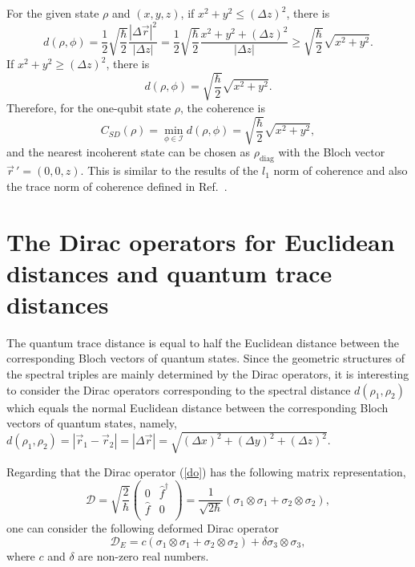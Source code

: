 \documentclass[a4paper,12pt]{article}
\begin{document}
For the given state $\rho$ and $(x, y, z)$, if
$x^2+y^2\leqslant (\Delta z)^2$, there is
\begin{equation}
	d(\rho,\phi)
	=\frac{1}{2}\sqrt{\frac{\hbar}{2}}\frac{|\Delta \vec{r}|^2}{|\Delta z|}
	=\frac{1}{2}\sqrt{\frac{\hbar}{2}}\frac{x^2+y^2+(\Delta z)^2}{|\Delta z|}
	\geqslant\sqrt{\frac{\hbar}{2}}\sqrt{x^2+y^2}.
\end{equation}
If $x^2+y^2\geqslant (\Delta z)^2$,
there is
\begin{equation}
	d(\rho,\phi)
	=\sqrt{\frac{\hbar}{2}}\sqrt{x^2+y^2}.
\end{equation}
Therefore, for the one-qubit state $\rho$, the coherence is
\begin{equation}
	C_{SD}(\rho)=\min_{\phi\in\mathcal{I}}d(\rho,\phi)=\sqrt{\frac{\hbar}{2}}\sqrt{x^2+y^2},
\end{equation}
and the nearest incoherent state can be chosen as $\rho_{\textrm{diag}}$ with the Bloch vector $\vec{r}\,'=(0, 0, z)$.
This is similar to the results of the $l_1$ norm of coherence \cite{Baumgratz} and also the trace norm of coherence defined in Ref.~\cite{Shao}.




\section{The Dirac operators for Euclidean distances and quantum trace distances}\label{sec5}
The quantum trace distance is equal to half the Euclidean distance between the corresponding Bloch vectors of quantum states.
Since the geometric structures of the spectral triples are mainly determined by the Dirac operators, it is interesting to consider the Dirac operators corresponding to the spectral distance $d(\rho_1, \rho_2)$ which equals the normal Euclidean distance between the corresponding Bloch vectors of quantum states, namely, $d(\rho_1, \rho_2) =|\vec{r}_1-\vec{r}_2|=|\Delta\vec{r}|= \sqrt{(\Delta x)^2 + (\Delta y)^2 + (\Delta z)^2}$.

Regarding that the Dirac operator (\ref{do}) has the following matrix representation,
\begin{equation}
	\mathcal{D}=\sqrt{\frac{2}{\hbar}}\left(
	\begin{array}{cccc}
		0 & \hat{f}^\dag \\
		\hat{f} & 0 \\
	\end{array}\right)=\frac{1}{\sqrt{2\hbar}}( \sigma_1\otimes \sigma _{1}  + \sigma_2\otimes \sigma _{2} ),
\end{equation}
one can consider the following deformed Dirac operator
\begin{equation}
	\mathcal{D}_{E} = c ( \sigma_1\otimes \sigma _{1}  + \sigma_2\otimes \sigma _{2})  + \delta\sigma_3\otimes \sigma _{3}, 
\end{equation}
where $c$ and $\delta$ are non-zero real numbers.
\end{document}
